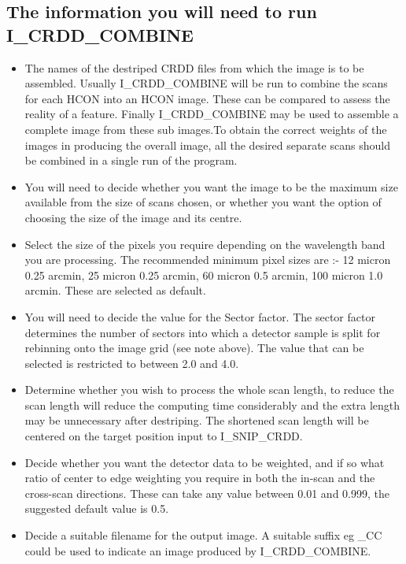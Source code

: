 \subsection{The information you will need to run I\_CRDD\_COMBINE}

\begin{itemize}

\item The names of the destriped CRDD files from which the image is to be
assembled. Usually I\_CRDD\_COMBINE will be run to combine the scans for each
HCON into an HCON image. These can be compared to assess the reality of a
feature. Finally I\_CRDD\_COMBINE may be used to assemble a complete image from
these sub images.To obtain the correct weights of the images in producing the
overall image, all the desired separate scans should be combined in a single
run of the program.

\item You will need to decide whether you want the image to be the maximum size
available from the size of scans chosen, or whether you want the option of
choosing the size of the image and its centre.

\item Select the size of the pixels you require depending
on the wavelength band you are processing. The recommended minimum pixel sizes
are :- 12 micron  0.25 arcmin, 25 micron  0.25 arcmin, 60 micron   0.5 arcmin,
100 micron  1.0 arcmin. These are selected as default.

\item You will need to decide the value for the Sector factor. The sector factor
determines the number of sectors into which a detector sample is split for
rebinning onto the image grid (see note above). The value that can be selected
is restricted to between 2.0 and 4.0.

\item Determine whether you wish to process the whole scan length, to reduce
the scan length will reduce the computing time considerably and the extra
length may be unnecessary after destriping. The shortened scan length will be
centered on the target position input to I\_SNIP\_CRDD.

\item Decide whether you want the detector data to be weighted, and if so what
ratio of center to edge weighting you require in both the in-scan and the
cross-scan directions. These can take any value between 0.01 and 0.999, the
suggested default value is 0.5.

\item Decide a suitable filename for the output image. A suitable suffix eg \_CC
could be used to indicate an image produced by I\_CRDD\_COMBINE.

\end{itemize}

